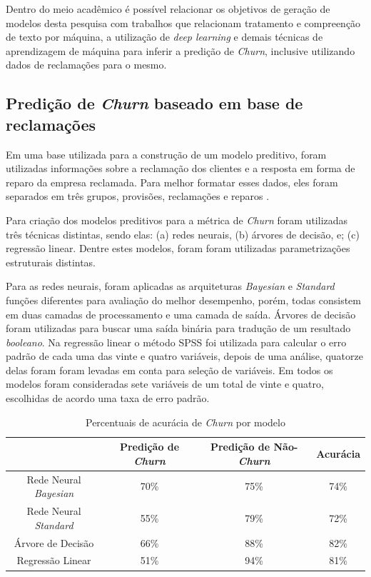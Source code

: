 \documentclass[12pt]{article}
\begin{document}
Dentro do meio acadêmico é possível relacionar os objetivos de geração de modelos desta pesquisa com trabalhos que relacionam tratamento e compreenção de texto por máquina, a utilização de \emph{deep learning} e demais técnicas de aprendizagem de máquina para inferir a predição de \emph{Churn}, inclusive utilizando dados de reclamações para o mesmo. 

\subsection{Predição de \emph{Churn} baseado em base de reclamações}

Em uma base utilizada para a construção de um modelo preditivo, foram utilizadas informações sobre a reclamação dos clientes e a resposta em forma de reparo da empresa reclamada. Para melhor formatar esses dados, eles foram separados em três grupos, provisões, reclamações e reparos \cite{hadden:06}.

Para criação dos modelos preditivos para a métrica de \emph{Churn} foram utilizadas três técnicas distintas, sendo elas: (a) redes neurais, (b) árvores de decisão, e; (c) regressão linear. Dentre estes modelos, foram foram utilizadas parametrizações estruturais distintas. 

Para as redes neurais, foram aplicadas as arquiteturas \emph{Bayesian} e \emph{Standard} funções diferentes para avaliação do melhor desempenho, porém, todas consistem em duas camadas de processamento e uma camada de saída. Árvores de decisão foram utilizadas para buscar uma saída binária para tradução de um resultado \emph{booleano}. Na regressão linear o método SPSS foi utilizada para calcular o erro padrão de cada uma das vinte e quatro variáveis, depois de uma análise, quatorze delas foram foram levadas em conta para seleção de variáveis. Em todos os modelos foram consideradas sete variáveis de um total de vinte e quatro, escolhidas de acordo uma taxa de erro padrão. 

\begin{table}[H]
\caption{Percentuais de acurácia de \emph{Churn} por modelo} \label{tab:churn_pred}
\begin{tabular}{|c|c|c|c|}
\hline
\textbf{}            & \textbf{Predição de \emph{Churn}} & \textbf{Predição de Não-\emph{Churn}} & \textbf{Acurácia} \\ \hline
Rede Neural \emph{Bayesian} & 70\%                       & 75\%                           & 74\%              \\ \hline
Rede Neural \emph{Standard} & 55\%                       & 79\%                           & 72\%              \\ \hline
Árvore de Decisão    & 66\%                       & 88\%                           & 82\%              \\ \hline
Regressão Linear     & 51\%                       & 94\%                           & 81\%              \\ \hline
\end{tabular}
\end{table}
\end{document}
